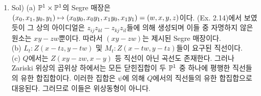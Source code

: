 		\begin{enumerate}[label=,itemindent=0mm]
		\item Sol) (a) $\mathbb{P}^1\times\mathbb{P}^1$의 Segre 매장은 $(x_0,x_1,y_0,y_1)\mapsto(x_0y_0,x_0y_1,x_1y_0,x_1y_1)=(w,x,y,z)$이다.
		(Ex. 2.14)에서 보였듯이 그 상의 아이디얼은 $z_{ij}z_{kl}-z_{kj}z_{il}$들에 의해 생성되며
		이들 중 자명하지 않은 원소는 $xy-zw$뿐이다. 따라서 $(xy-zw)$는 제시된 Segre 매장이다.\\
		(b) $L_t:Z(x-tz,y-tw)$ 및 $M_t:Z(x-tw,y-tz)$들이 요구된 직선이다.\\
		(c) $Q$에서는 $Z(xy-zw,x-y)$ 등 직선이 아닌 곡선도 존재한다. 그러나 Zariski 위상의 곱위상 하에서는
		모든 닫힌집합이 두 $\mathbb{P}^1$ 중 하나에 평행한 직선들의 유한 합집합이다.
		이러한 집합은 $\psi$에 의해 $Q$에서의 직선들의 유한 합집합으로 대응된다. 그러므로 이들은 위상동형이 아니다.\\
		\end{enumerate}
